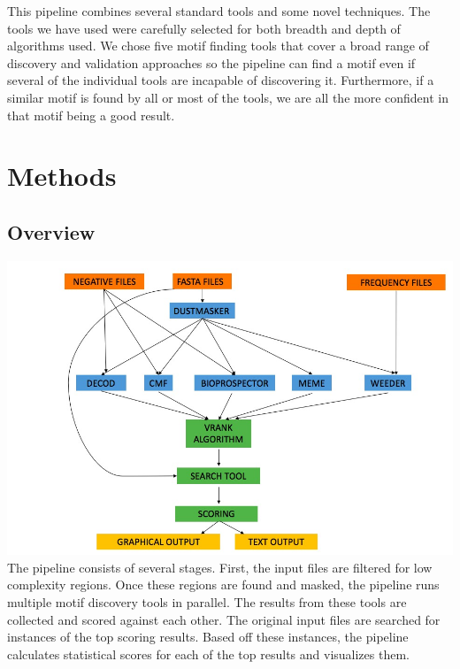 \documentclass[12pt]{article}
\newenvironment{SLOPPY}{\begin{sloppypar}\hbadness=10000}{\end{sloppypar}}
\newcommand{\comment}[1]{\textcolor{red}{\it{#1}}}
\begin{document}
\begin{SLOPPY}
This pipeline combines several standard tools and some novel
techniques. The tools we have used were carefully selected for both breadth
and depth of algorithms used. We chose five motif finding tools
that cover a broad range of discovery and validation approaches so the
pipeline can find a motif even
if several of the individual tools are incapable of discovering it.
Furthermore, if a similar motif is found by all or most of the tools, we are
all the more confident in that motif being a good result.
\end{SLOPPY}

\section{Methods}
\label{section:methods}

\subsection{Overview}
\label{section:Overview}
\begin{SLOPPY}
\includegraphics[scale=.4]{mcat_ensemble_v1.jpg}\\
The pipeline consists of several stages. First, the input files are
filtered for low complexity regions. Once these regions are found and masked,
the pipeline runs multiple  motif discovery tools in parallel.
The results from these tools are collected and scored against
each other.
The original input files are searched for instances of the top scoring results.
Based off these instances, the pipeline calculates statistical scores
for each of the top results
and visualizes them.\\
\end{SLOPPY}
\end{document}
